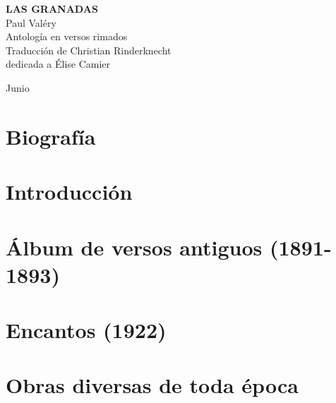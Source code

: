 \documentclass[11pt,a4paper]{book}
\begin{document}
\thispagestyle{empty}

\vspace*{70mm}

\begin{center}
{\Huge\textbf{LAS GRANADAS}} \\
\bigskip
{\Large Paul Valéry} \\
\bigskip
Antología en versos rimados\\
\bigskip
Traducción de Christian Rinderknecht\\
dedicada a Élise Camier
\end{center}

\bigskip\bigskip\bigskip
\begin{center}
  Junio 
\end{center}


\part{Biografía}



\part{Introducción}



\part{Álbum de versos antiguos (1891-1893)}










\part{Encantos (1922)}











\part{Obras diversas de toda época}






\tableofcontents
\end{document}
